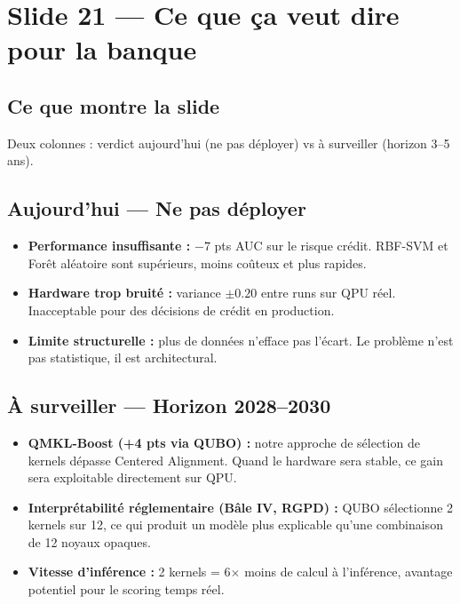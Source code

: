 \documentclass[12pt, a4paper]{article}
\begin{document}
\section{Slide 21 — Ce que ça veut dire pour la banque}

\subsection*{Ce que montre la slide}

Deux colonnes : verdict aujourd'hui (ne pas déployer) vs à surveiller (horizon 3--5 ans).

\subsection*{Aujourd'hui — Ne pas déployer}

\begin{itemize}
  \item \textbf{Performance insuffisante :} $-7$ pts AUC sur le risque crédit.
        RBF-SVM et Forêt aléatoire sont supérieurs, moins coûteux et plus rapides.
  \item \textbf{Hardware trop bruité :} variance $\pm 0.20$ entre runs sur QPU réel.
        Inacceptable pour des décisions de crédit en production.
  \item \textbf{Limite structurelle :} plus de données n'efface pas l'écart.
        Le problème n'est pas statistique, il est architectural.
\end{itemize}

\subsection*{À surveiller — Horizon 2028--2030}

\begin{itemize}
  \item \textbf{QMKL-Boost (+4 pts via QUBO) :} notre approche de sélection de kernels
        dépasse Centered Alignment. Quand le hardware sera stable,
        ce gain sera exploitable directement sur QPU.
  \item \textbf{Interprétabilité réglementaire (Bâle IV, RGPD) :}
        QUBO sélectionne 2 kernels sur 12, ce qui produit un modèle
        plus explicable qu'une combinaison de 12 noyaux opaques.
  \item \textbf{Vitesse d'inférence :} 2 kernels = 6$\times$ moins de calcul
        à l'inférence, avantage potentiel pour le scoring temps réel.
\end{itemize}
\end{document}
